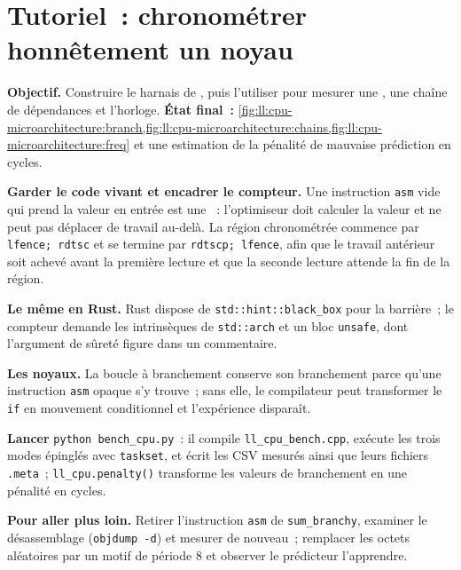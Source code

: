 \section{Tutoriel~: chronométrer honnêtement un noyau}\label{tut:ll:cpu-microarchitecture:tut}

\begin{tutorial}
\textbf{Objectif.} Construire le harnais de , puis l'utiliser pour mesurer une , une chaîne de dépendances et
l'horloge. \textbf{État final~:}
\cref{fig:ll:cpu-microarchitecture:branch,fig:ll:cpu-microarchitecture:chains,fig:ll:cpu-microarchitecture:freq} et une
estimation de la pénalité de mauvaise prédiction en cycles.
\begin{tutsteps}
\item \textbf{Garder le code vivant et encadrer le compteur.} Une instruction \texttt{asm} vide qui prend la valeur en entrée est une
~: l'optimiseur doit calculer la valeur et ne peut pas déplacer de travail au-delà. La région chronométrée
commence par \texttt{lfence; rdtsc} et se termine par \texttt{rdtscp; lfence}, afin que le travail antérieur soit achevé avant la
première lecture et que la seconde lecture attende la fin de la région.
\label{lst:ll:cpu-microarchitecture:cpp}
\item \textbf{Le même en Rust.} Rust dispose de \texttt{std::hint::black\_box} pour la barrière~; le compteur demande les
intrinsèques de \texttt{std::arch} et un bloc \texttt{unsafe}, dont l'argument de sûreté figure dans un commentaire.
\label{lst:ll:cpu-microarchitecture:rust}
\item \textbf{Les noyaux.} La boucle à branchement conserve son branchement parce qu'une instruction \texttt{asm} opaque s'y trouve~;
sans elle, le compilateur peut transformer le \texttt{if} en mouvement conditionnel et l'expérience disparaît.
\label{lst:ll:cpu-microarchitecture:kernels}
\item \textbf{Lancer} \texttt{python bench\_cpu.py}~: il compile \texttt{ll\_cpu\_bench.cpp}, exécute les trois modes épinglés
avec \texttt{taskset}, et écrit les CSV mesurés ainsi que leurs fichiers \texttt{.meta}~; \texttt{ll\_cpu.penalty()} transforme
les valeurs de branchement en une pénalité en cycles.
\end{tutsteps}
\textbf{Pour aller plus loin.} Retirer l'instruction \texttt{asm} de \texttt{sum\_branchy}, examiner le désassemblage
(\texttt{objdump -d}) et mesurer de nouveau~; remplacer les octets aléatoires par un motif de période 8 et observer le prédicteur
l'apprendre.
\end{tutorial}

